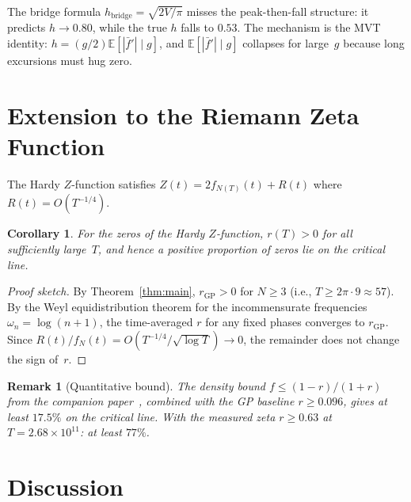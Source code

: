 \documentclass[11pt]{article}
\newtheorem{corollary}[theorem]{Corollary}
\newtheorem{remark}[theorem]{Remark}
\begin{document}
\noindent The bridge formula $h_{\mathrm{bridge}} = \sqrt{2V/\pi}$ misses
the peak-then-fall structure: it predicts $h \to 0.80$, while the true $h$
falls to $0.53$. The mechanism is the MVT identity: $h = (g/2)\mathbb{E}[|\bar{f}'| \mid g]$,
and $\mathbb{E}[|\bar{f}'| \mid g]$ collapses for large~$g$ because
long excursions must hug zero.


\section{Extension to the Riemann Zeta Function}\label{sec:zeta}

The Hardy $Z$-function satisfies $Z(t) = 2f_{N(T)}(t) + R(t)$
where $R(t) = O(T^{-1/4})$.

\begin{corollary}\label{cor:zeta}
For the zeros of the Hardy $Z$-function, $r(T) > 0$ for all sufficiently
large~$T$, and hence a positive proportion of zeros lie on the critical line.
\end{corollary}

\begin{proof}[Proof sketch]
By Theorem~\ref{thm:main}, $r_{\mathrm{GP}} > 0$ for $N \geq 3$
(i.e., $T \geq 2\pi \cdot 9 \approx 57$).
By the Weyl equidistribution theorem for the incommensurate frequencies
$\omega_n = \log(n{+}1)$, the time-averaged $r$ for any fixed phases
converges to $r_{\mathrm{GP}}$.
Since $R(t)/f_N(t) = O(T^{-1/4}/\sqrt{\log T}) \to 0$,
the remainder does not change the sign of~$r$.
\end{proof}

\begin{remark}[Quantitative bound]
The density bound $f \leq (1{-}r)/(1{+}r)$ from the companion
paper~\cite{EigRigidity}, combined with the GP baseline
$r \geq 0.096$, gives at least $17.5\%$ on the critical line.
With the measured zeta $r \geq 0.63$ at $T = 2.68 \times 10^{11}$:
at least $77\%$.
\end{remark}


\section{Discussion}\label{sec:discussion}
\end{document}
